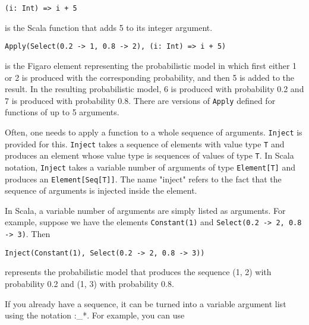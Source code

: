 \begin{flushleft}
\texttt{(i: Int) => i + 5}
\end{flushleft}

is the Scala function that adds 5 to its integer argument.

\begin{flushleft}
\texttt{Apply(Select(0.2 -> 1, 0.8 -> 2), (i: Int) => i + 5)}
\end{flushleft}

is the Figaro element representing the probabilistic model in which first either 1 or 2 is produced with the corresponding probability, and then 5 is added to the result. In the resulting probabilistic model, 6 is produced with probability 0.2 and 7 is produced with probability 0.8. There are versions of \texttt{Apply} defined for functions of up to 5 arguments. 


Often, one needs to apply a function to a whole sequence of arguments. \texttt{Inject} is provided for this. \texttt{Inject} takes a sequence of elements with value type \texttt{T} and produces an element whose value type is sequences of values of type \texttt{T}. In Scala notation, \texttt{Inject} takes a variable number of arguments of type \texttt{Element[T]} and produces an \texttt{Element[Seq[T]]}. The name "inject" refers to the fact that the sequence of arguments is injected inside the element.

In Scala, a variable number of arguments are simply listed as arguments. For example, suppose we have the elements \texttt{Constant(1)} and  \texttt{Select(0.2 -> 2, 0.8 -> 3)}. Then

\begin{flushleft}
\texttt{Inject(Constant(1), Select(0.2 -> 2, 0.8 -> 3))}
\end{flushleft}

represents the probabilistic model that produces the sequence (1, 2) with probability
0.2 and (1, 3) with probability 0.8.

If you already have a sequence, it can be turned into a variable argument list using the notation :\_*. For example, you can use

